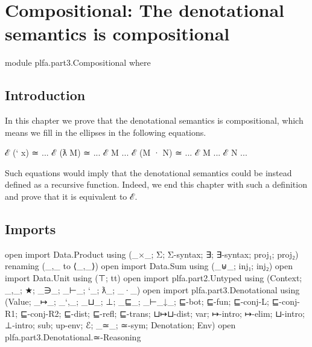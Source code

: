 \hypertarget{Compositional}{%
\chapter{Compositional: The denotational semantics is
compositional}\label{Compositional}}

\begin{fence}
\begin{code}
module plfa.part3.Compositional where
\end{code}
\end{fence}

\hypertarget{introduction}{%
\section{Introduction}\label{introduction}}

In this chapter we prove that the denotational semantics is
compositional, which means we fill in the ellipses in the following
equations.

\begin{myDisplay}
ℰ (` x) ≃ ...
ℰ (ƛ M) ≃ ... ℰ M ...
ℰ (M · N) ≃ ... ℰ M ... ℰ N ...
\end{myDisplay}

Such equations would imply that the denotational semantics could be
instead defined as a recursive function. Indeed, we end this chapter
with such a definition and prove that it is equivalent to ℰ.

\hypertarget{imports}{%
\section{Imports}\label{imports}}

\begin{fence}
\begin{code}
open import Data.Product using (_×_; Σ; Σ-syntax; ∃; ∃-syntax; proj₁; proj₂)
  renaming (_,_ to ⟨_,_⟩)
open import Data.Sum using (_⊎_; inj₁; inj₂)
open import Data.Unit using (⊤; tt)
open import plfa.part2.Untyped
  using (Context; _,_; ★; _∋_; _⊢_; `_; ƛ_; _·_)
open import plfa.part3.Denotational
  using (Value; _↦_; _`,_; _⊔_; ⊥; _⊑_; _⊢_↓_;
         ⊑-bot; ⊑-fun; ⊑-conj-L; ⊑-conj-R1; ⊑-conj-R2;
         ⊑-dist; ⊑-refl; ⊑-trans; ⊔↦⊔-dist;
         var; ↦-intro; ↦-elim; ⊔-intro; ⊥-intro; sub;
         up-env; ℰ; _≃_; ≃-sym; Denotation; Env)
open plfa.part3.Denotational.≃-Reasoning
\end{code}
\end{fence}

